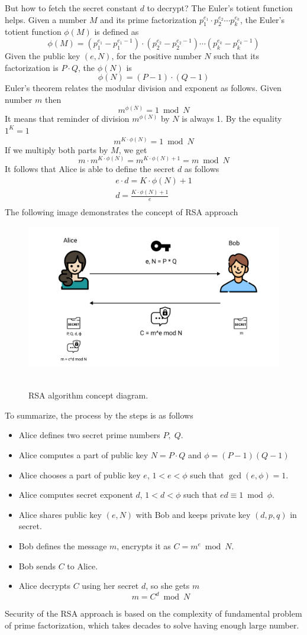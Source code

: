 But how to fetch the secret constant $d$ to decrypt?
The Euler's totient function helps.
Given a number $M$ and its prime factorization $p_1^{e_1}\cdot p_2^{e_2} \cdots p_k^{e_k}$, the Euler's totient function
$\phi(M)$ is defined as
\[
    \phi(M) = (p_1^{e_1} - p_1^{e_1 - 1}) \cdot (p_2^{e_2} - p_2^{e_2 - 1}) \cdots (p_k^{e_k} - p_k^{e_k - 1})
\]
Given the public key $(e, N)$, for the positive number $N$ such that its factorization is $P \cdot Q$, the $\phi(N)$ is
\[
    \phi(N) = (P - 1) \cdot (Q - 1)
\]
Euler's theorem relates the modular division and exponent as follows.
Given number $m$ then
\[
    m^{\phi(N)} = 1 \bmod N
\]
It means that reminder of division $m^{\phi(N)}$ by $N$ is always 1.
By the equality $1^K = 1$
\[
    m^{K \cdot \phi(N)} = 1 \bmod N
\]
If we multiply both parts by $M$, we get
\[
    m \cdot m^{K \cdot \phi(N)} = m^{K \cdot \phi(N) + 1} = m \bmod N
\]
It follows that Alice is able to define the secret $d$ as follows
\begin{gather*}
    e \cdot d = K \cdot \phi(N) + 1\\
    d = \frac{K \cdot \phi(N) + 1}{e}\\
\end{gather*}
The following image demonstrates the concept of RSA approach
\begin{figure}[H]
    \centering
    \includegraphics[width=1\textwidth]{./img/RSA}
    ~\caption{RSA algorithm concept diagram.}\label{fig:figure8}
\end{figure}
To summarize, the process by the steps is as follows
\begin{itemize}
    \item Alice defines two secret prime numbers $P, \; Q$.
    \item Alice computes a part of public key $N = P \cdot Q$ and $\phi = (P-1)(Q-1)$
    \item Alice chooses a part of public key $e$, $1<e< \phi$ such that $\gcd(e, \phi) = 1$.
    \item Alice computes secret exponent $d$, $1<d< \phi$ such that $ed \equiv 1 \bmod \phi$.
    \item Alice shares public key $(e, N)$ with Bob and keeps private key $(d, p, q)$ in secret.
    \item Bob defines the message $m$, encrypts it as $C = m^{e} \bmod N$.
    \item Bob sends $C$ to Alice.
    \item Alice decrypts $C$ using her secret $d$, so she gets $m$
    \[
        m = C^d \bmod N
    \]
\end{itemize}
Security of the RSA approach is based on the complexity of fundamental problem of prime factorization,
which takes decades to solve having enough large number.
